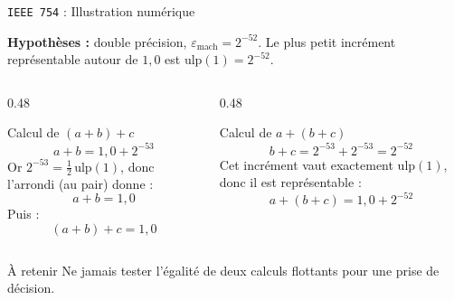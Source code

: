 \begin{frame}{\texttt{IEEE 754} : Illustration numérique}

  \textbf{Hypothèses :} double précision, $\varepsilon_{\text{mach}} = 2^{-52}$.
  Le plus petit incrément représentable autour de $1{,}0$ est
  $\text{ulp}(1) = 2^{-52}$.

  \vspace{0.4cm}
  \begin{columns}[T]
    \begin{column}{0.48\textwidth}
      \begin{block}{Calcul de $(a+b)+c$}
        \[
          a + b = 1{,}0 + 2^{-53}
        \]
        Or $2^{-53} = \tfrac{1}{2}\,\text{ulp}(1)$, donc l'arrondi
        (au pair) donne :
        \[
          a + b = 1{,}0
        \]
        Puis :
        \[
          (a+b) + c = 1{,}0
        \]
      \end{block}
    \end{column}

    \begin{column}{0.48\textwidth}
      \begin{block}{Calcul de $a+(b+c)$}
        \[
          b + c = 2^{-53} + 2^{-53} = 2^{-52}
        \]
        Cet incrément vaut exactement $\text{ulp}(1)$, donc il est
        représentable :
        \[
          a + (b+c) = 1{,}0 + 2^{-52}
        \]
      \end{block}
    \end{column}
  \end{columns}

  \vspace{0.2cm}
  \begin{center}
  \end{center}

  \vspace{0.3cm}
  \begin{alertblock}{À retenir}
    Ne jamais tester l'égalité de deux calculs flottants pour une prise de décision.
  \end{alertblock}
\end{frame}


